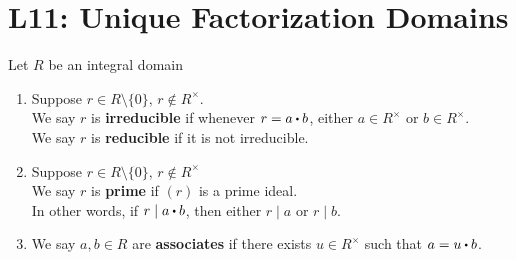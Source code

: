 \documentclass[../Main.tex]{subfiles}
\begin{document}
\chapter{L11: Unique Factorization Domains}
\begin{dfn}[title = {Irreducible/Reducible, Prime, Associate Elements}]
	Let $R$ be an integral domain
	\begin{enumerate}
		\item Suppose $r\in R\setminus\{0\},\, r\notin R^\times$.\\
		We say $r$ is \textbf{irreducible} if whenever $r=a\rdot b$, either $a\in R^\times$ or $b\in R^\times$.\\
		We say $r$ is \textbf{reducible} if it is not irreducible.
		\item Suppose $r\in R\setminus\{0\},\, r\notin R^\times$\\
		We say $r$ is \textbf{prime} if $(r)$ is a prime ideal.\\
		In other words, if $r\mid a\rdot b$, then either $r\mid a$ or $r\mid b$.
		\item We say $a,b \in R$ are \textbf{associates} if there exists $u\in R^\times$ such that $a=u\rdot b$.
	\end{enumerate}
\end{dfn}
\end{document}
